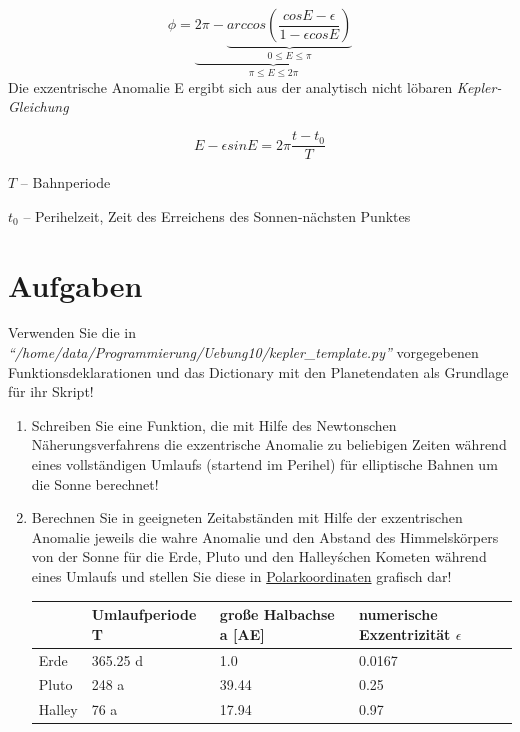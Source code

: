 \documentclass{scrartcl}	    %
\begin{document}
\[
\phi = \underbrace{2\pi - \underbrace{arccos(\frac{cos E-\epsilon}{1-\epsilon cos E})}_{0 \le E \le \pi}}_{\pi \le E \le 2\pi}
\]
Die exzentrische Anomalie E ergibt sich aus der analytisch nicht löbaren \emph{Kepler-Gleichung}

\[
E - \epsilon sin E = 2 \pi \frac{t - t_0}{T}
\]
\begin{description}
\item $T$ -- Bahnperiode
\item $t_0$ -- Perihelzeit, Zeit des Erreichens des Sonnen-nächsten Punktes
\end{description}

\section*{Aufgaben}
Verwenden Sie die in \emph{"`/home/data/Programmierung/Uebung10/kepler\_template.py"'} 
vorgegebenen Funktionsdeklarationen und das Dictionary mit den Planetendaten als Grundlage für ihr Skript!

\begin{enumerate}
\item Schreiben Sie eine Funktion, die mit Hilfe des Newtonschen Näherungsverfahrens die exzentrische Anomalie zu beliebigen Zeiten während eines vollständigen Umlaufs (startend im Perihel) für elliptische Bahnen um die Sonne berechnet!
\item Berechnen Sie in geeigneten Zeitabständen mit Hilfe der exzentrischen Anomalie jeweils die wahre Anomalie und den Abstand des Himmelskörpers von der Sonne für die Erde, Pluto und den Halley\'schen Kometen während eines Umlaufs und stellen Sie diese in \href{http://matplotlib.org/api/pyplot_api.html#matplotlib.pyplot.polar}{Polarkoordinaten} grafisch dar! %

\begin{tabular}{|m{1cm}|m{3.5cm}|m{3.5cm}|m{3.5cm}|}\hline
&Umlaufperiode T& große Halbachse a [AE]&numerische Exzentrizität $\epsilon$\\ \hline
Erde&365.25 d&1.0&0.0167\\
Pluto&248 a&39.44&0.25\\
Halley&76 a&17.94&0.97\\ \hline
\end{tabular}
\end{enumerate}
\end{document}
